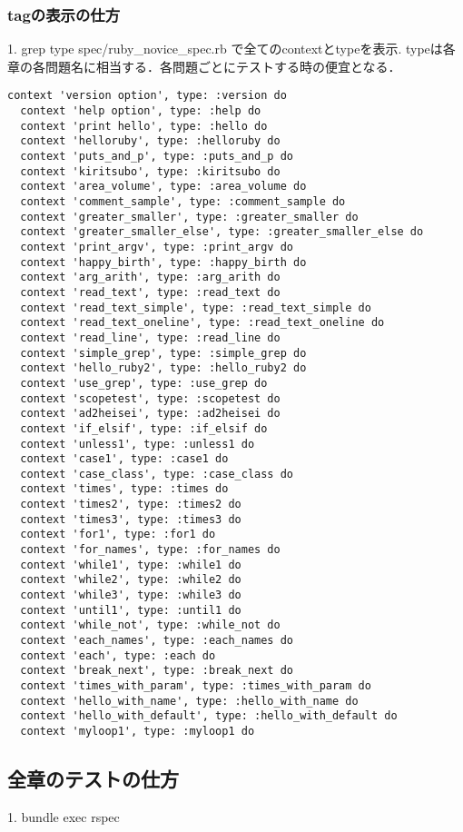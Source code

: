\subsubsection{tagの表示の仕方}
1. grep type spec/ruby\_novice\_spec.rb  で全てのcontextとtypeを表示.
typeは各章の各問題名に相当する．各問題ごとにテストする時の便宜となる．
\begin{lstlisting}[style=customRuby,basicstyle={\scriptsize\ttfamily}]
  context 'version option', type: :version do
  context 'help option', type: :help do
  context 'print hello', type: :hello do
  context 'helloruby', type: :helloruby do
  context 'puts_and_p', type: :puts_and_p do
  context 'kiritsubo', type: :kiritsubo do
  context 'area_volume', type: :area_volume do
  context 'comment_sample', type: :comment_sample do
  context 'greater_smaller', type: :greater_smaller do
  context 'greater_smaller_else', type: :greater_smaller_else do
  context 'print_argv', type: :print_argv do
  context 'happy_birth', type: :happy_birth do
  context 'arg_arith', type: :arg_arith do
  context 'read_text', type: :read_text do
  context 'read_text_simple', type: :read_text_simple do
  context 'read_text_oneline', type: :read_text_oneline do
  context 'read_line', type: :read_line do
  context 'simple_grep', type: :simple_grep do
  context 'hello_ruby2', type: :hello_ruby2 do
  context 'use_grep', type: :use_grep do
  context 'scopetest', type: :scopetest do
  context 'ad2heisei', type: :ad2heisei do
  context 'if_elsif', type: :if_elsif do
  context 'unless1', type: :unless1 do
  context 'case1', type: :case1 do
  context 'case_class', type: :case_class do
  context 'times', type: :times do
  context 'times2', type: :times2 do
  context 'times3', type: :times3 do
  context 'for1', type: :for1 do
  context 'for_names', type: :for_names do
  context 'while1', type: :while1 do
  context 'while2', type: :while2 do
  context 'while3', type: :while3 do
  context 'until1', type: :until1 do
  context 'while_not', type: :while_not do
  context 'each_names', type: :each_names do
  context 'each', type: :each do
  context 'break_next', type: :break_next do
  context 'times_with_param', type: :times_with_param do
  context 'hello_with_name', type: :hello_with_name do
  context 'hello_with_default', type: :hello_with_default do
  context 'myloop1', type: :myloop1 do
\end{lstlisting}
\subsection{全章のテストの仕方}
1. bundle exec rspec

